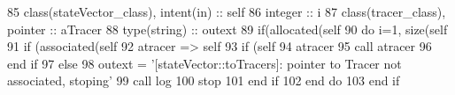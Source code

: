 \begin{DoxyCode}
85     \textcolor{keywordtype}{class}(stateVector\_class), \textcolor{keywordtype}{intent(in)} :: self
86     \textcolor{keywordtype}{integer} :: i
87     \textcolor{keywordtype}{class}(tracer\_class), \textcolor{keywordtype}{pointer} :: aTracer
88     \textcolor{keywordtype}{type}(string) :: outext
89     \textcolor{keywordflow}{if}(\textcolor{keyword}{allocated}(self%
90         \textcolor{keywordflow}{do} i=1, \textcolor{keyword}{size}(self%
91             \textcolor{keywordflow}{if} (\textcolor{keyword}{associated}(self%
92                 atracer => self%
93                 \textcolor{keywordflow}{if} (self%
94                     atracer%
95                     \textcolor{keyword}{call }atracer%
96 \textcolor{keywordflow}{                end if}
97             \textcolor{keywordflow}{else}
98                 outext = \textcolor{stringliteral}{'[stateVector::toTracers]: pointer to Tracer not associated, stoping'}
99                 \textcolor{keyword}{call }log%
100                 stop
101 \textcolor{keywordflow}{            end if}
102 \textcolor{keywordflow}{        end do}
103 \textcolor{keywordflow}{    end if}
\end{DoxyCode}
